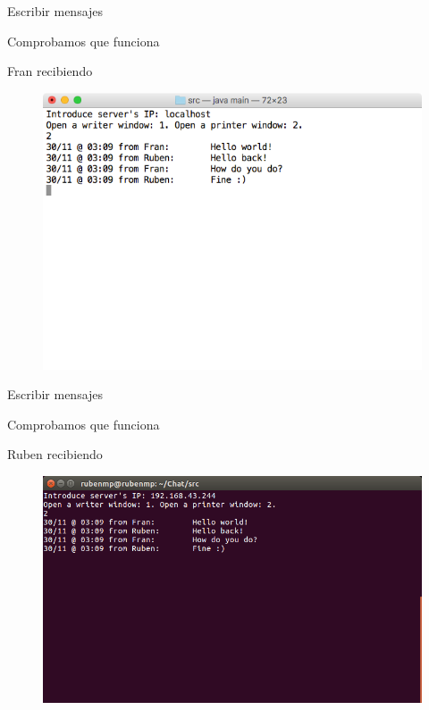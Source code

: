 

\begin{frame}{Escribir mensajes}
	\begin{block}{ }
		Comprobamos que funciona
	\end{block}
	
	\begin{exampleblock}{Fran recibiendo}
		\begin{figure}[H]
			\includegraphics[scale=0.4]{./Imagenes/franprinter2.png}
		\end{figure}
	\end{exampleblock}
\end{frame}




\begin{frame}{Escribir mensajes}
	\begin{block}{ }
		Comprobamos que funciona
	\end{block}
	
	\begin{exampleblock}{Ruben recibiendo}
		\begin{figure}[H]
			\includegraphics[scale=0.4]{./Imagenes/rubenprinter2.png}
		\end{figure}
	\end{exampleblock}
\end{frame}

